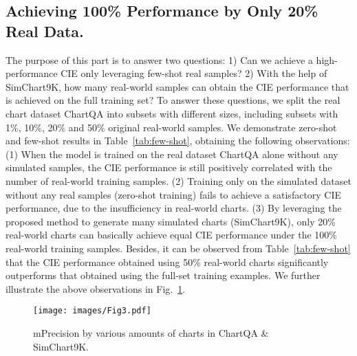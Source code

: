 \documentclass{article} \usepackage{iclr2024_conference,times}
\begin{document}
{\subsection{Achieving 100\% Performance by Only 20\% Real Data.}
\vspace{-8pt}
The purpose of this part is to answer two questions: 1) Can we achieve a high-performance CIE only leveraging few-shot real samples? 2) With the help of SimChart9K, how many real-world samples can obtain the CIE performance that is achieved on the full training set? To answer these questions, we split the real chart dataset ChartQA into subsets with different sizes, including subsets with 1\%, 10\%, 20\% and 50\% original real-world samples. We demonstrate zero-shot and few-shot results in Table~\ref{tab:few-shot}, obtaining the following observations: (1) When the model is trained on the real dataset ChartQA alone without any simulated samples, the CIE performance is still positively correlated with the number of real-world training samples. (2) Training only on the simulated dataset without any real samples (zero-shot training) fails to achieve a satisfactory CIE performance, due to the insufficiency in real-world charts. (3) By leveraging the proposed method to generate many simulated charts (SimChart9K), only 20\% real-world charts can basically achieve equal CIE performance under the 100\% real-world training samples. Besides, it can be observed from Table~\ref{tab:few-shot} that the CIE performance obtained using 50\% real-world charts significantly outperforms that obtained using the full-set training examples. We further illustrate the above observations in Fig.~\ref{fig:heat}.




\begin{figure}[tb!]
\vspace{-3pt}
\begin{minipage}{0.42\linewidth}
\centering
\texttt{[image: images/Fig3.pdf]}
\vspace{-18pt}
\caption{mPrecision by various amounts of charts in ChartQA \& SimChart9K.}
\vspace{-10pt}
\label{fig:heat}
\end{minipage}
\hfill
\begin{minipage}{0.58\linewidth}
\vspace{-4pt}
\centering
{}
\end{minipage}
\end{figure}}
\end{document}
